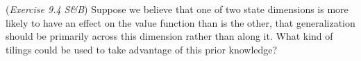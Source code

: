 (\textit{Exercise 9.4 S\&B})
Suppose we believe that one of two state dimensions is more likely to have
an effect on the value function than is the other, that generalization should be primarily
across this dimension rather than along it. What kind of tilings could be used to take
advantage of this prior knowledge?